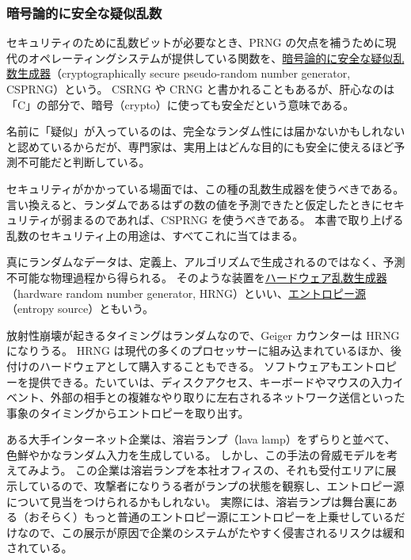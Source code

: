 \documentclass[uplatex]{jsarticle}
\def\label#1{}%
\begin{document}
\subsubsection{暗号論的に安全な疑似乱数}

\begin{dfn}[暗号論的に安全な疑似乱数生成器]\label{dfn:ch5-csprng}
セキュリティのために乱数ビットが必要なとき、PRNG の欠点を補うために現代のオペレーティングシステムが提供している関数を、\underline{暗号論的に安全な疑似乱数生成器}（cryptographically secure pseudo-random number generator, CSPRNG）という。
CSRNG や CRNG と書かれることもあるが、肝心なのは「C」の部分で、暗号（crypto）に使っても安全だという意味である。
\end{dfn}

名前に「疑似」が入っているのは、完全なランダム性には届かないかもしれないと認めているからだが、専門家は、実用上はどんな目的にも安全に使えるほど予測不可能だと判断している。

セキュリティがかかっている場面では、この種の乱数生成器を使うべきである。
言い換えると、ランダムであるはずの数の値を予測できたと仮定したときにセキュリティが弱まるのであれば、CSPRNG を使うべきである。
本書で取り上げる乱数のセキュリティ上の用途は、すべてこれに当てはまる。

\begin{dfn}[ハードウェア乱数生成器]\label{dfn:ch5-hrng}
真にランダムなデータは、定義上、アルゴリズムで生成されるのではなく、予測不可能な物理過程から得られる。
そのような装置を\underline{ハードウェア乱数生成器}（hardware random number generator, HRNG）といい、\underline{エントロピー源}（entropy source）ともいう。
\end{dfn}

\begin{exa}[エントロピー源]\label{exa:ch5-entropy-sources}
放射性崩壊が起きるタイミングはランダムなので、Geiger カウンターは HRNG になりうる。
HRNG は現代の多くのプロセッサーに組み込まれているほか、後付けのハードウェアとして購入することもできる。
ソフトウェアもエントロピーを提供できる。たいていは、ディスクアクセス、キーボードやマウスの入力イベント、外部の相手との複雑なやり取りに左右されるネットワーク送信といった事象のタイミングからエントロピーを取り出す。
\end{exa}

\begin{exa}[溶岩ランプによるエントロピー]\label{exa:ch5-lava-lamps}
ある大手インターネット企業は、溶岩ランプ（lava lamp）をずらりと並べて、色鮮やかなランダム入力を生成している。
しかし、この手法の脅威モデルを考えてみよう。
この企業は溶岩ランプを本社オフィスの、それも受付エリアに展示しているので、攻撃者になりうる者がランプの状態を観察し、エントロピー源について見当をつけられるかもしれない。
実際には、溶岩ランプは舞台裏にある（おそらく）もっと普通のエントロピー源にエントロピーを上乗せしているだけなので、この展示が原因で企業のシステムがたやすく侵害されるリスクは緩和されている。
\end{exa}
\end{document}

